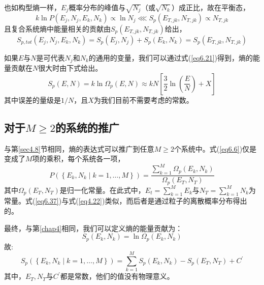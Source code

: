 \documentclass[UTF8]{ctexart}
\numberwithin{equation}{section}%
\numberwithin{figure}{section}%
\begin{document}
    也如构型熵一样，$E_j$概率分布的峰值与$\sqrt{N_j}$（或$\sqrt{N_k}$）成正比，故在平衡态，
    \begin{equation}
        k \ln P\left(E_{j}, N_{j}, E_{k}, N_{k}\right) \propto \ln N_{j} \lll S_{p}\left(E_{T, j k}, N_{T, j k}\right) \propto N_{T, j k}
    \end{equation}
    且复合系统熵中能量相关的贡献由$S_p(E_{T,jk},N_{T,jk})$给出，
    \begin{equation}
        S_{p, t o t}\left(E_{j}, N_{j}, E_{k}, N_{k}\right)=S_{p}\left(E_{j}, N_{j}\right)+S_{p}\left(E_{k}, N_{k}\right)=S_{p}\left(E_{T, j k}, N_{T, j k}\right)
    \end{equation}

    如果$E$与$N$是可代表$N_j$和$N_k$的通用的变量，我们可以通过式(\ref{eq6.21})得到，熵的能量贡献在$N$很大时由下式给出。
    \begin{equation}
        S_{p}(E, N)=k \ln \Omega_{p}(E, N) \approx k N\left[\frac{3}{2} \ln \left(\frac{E}{N}\right)+X\right]
    \end{equation}
    其中误差的量级是$1/N$，且$X$为我们目前不需要考虑的常数。
    \subsection{\texorpdfstring{对于$M\geq2$的系统的推广}{对于M≥2的系统的推广}}\label{sec6.6}
    与第\ref{sec4.8}节相同，熵的表达式可以推广到任意$M\geq 2$个系统中。式(\ref{eq6.6})仅是变成了$M$项的乘积，每个系统各一项，
    \begin{equation}\label{eq6.37}
        P\left(\left\{E_{k}, N_{k} \mid k=1, \ldots, M\right\}\right)=\frac{\sum_{k=1}^{M} \Omega_{p}\left(E_{k}, N_{k}\right)}{\Omega_{p}\left(E_{T}, N_{T}\right)}
    \end{equation}
    其中$\Omega_{p}\left(E_{T}, N_{T}\right)$是归一化常量。在此式中，$E_t=\sum_{k=1}^{M}E_k$与$N_T=\sum_{k=1}^{M}N_k$为常量。式(\ref{eq6.37})与式(\ref{eq4.22})类似，而后者是通过粒子的离散概率分布得出的。

    最终，与第\ref{chap4}相同，我们可以定义熵的能量贡献为：
    \begin{equation}
        S_{p}\left(E_{k}, N_{k}\right)=\ln \Omega_{p}\left(E_{k}, N_{k}\right)
    \end{equation}
    故:
    \begin{equation}\label{eq6.39}
        S_{p}\left(\left\{E_{k}, N_{k} \mid k=1, \ldots, M\right\}\right)=\sum_{k=1}^{M} S_{p}\left(E_{k}, N_{k}\right)-S_{p}\left(E_{T}, N_{T}\right)+C^{\prime}
    \end{equation}
    其中，$E_{T}, N_{T}$与$C^{\prime}$都是常数，他们的值没有物理意义。
\end{document}
